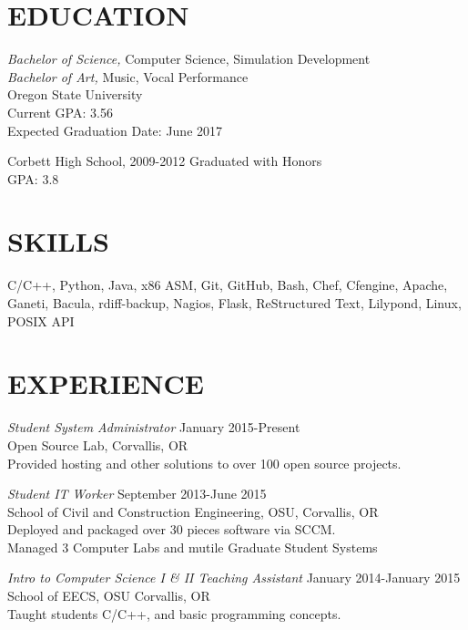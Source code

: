 \documentclass[line,margin]{res}
\begin{document}
\address{(503)-758-6952, fahlmantaylor@gmail.com, tfahl.com}
\address{github.com/fahlmant, irc: recyclops or fahlmant on freenode}
\begin{resume}
 
\section{EDUCATION}
                    {\sl Bachelor of Science,} Computer Science, Simulation Development \\
                    {\sl Bachelor of Art,} Music, Vocal Performance \\
                    Oregon State University\\
                    Current GPA: 3.56\\
                    Expected Graduation Date: June 2017 
                    
                    Corbett High School, 2009-2012
                    Graduated with Honors\\
                    GPA: 3.8
\section{SKILLS}
                    C/C++, Python, Java, x86 ASM, Git, GitHub, Bash, Chef, Cfengine, Apache, Ganeti, Bacula, rdiff-backup,
                    Nagios, Flask, ReStructured Text, Lilypond, Linux, POSIX API
\section{EXPERIENCE}
                    {\sl Student System Administrator} \hfill January 2015-Present \\
                    Open Source Lab, 
                    Corvallis, OR\\
                    Provided hosting and other solutions to over 100 open source projects.

                    {\sl Student IT Worker} \hfill September 2013-June 2015 \\
                    School of Civil and Construction Engineering, OSU, 
                    Corvallis, OR\\ 
                    Deployed and packaged over 30 pieces software via SCCM.\\
                    Managed 3 Computer Labs and mutile Graduate Student Systems

                    {\sl Intro to Computer Science I \& II Teaching Assistant} \hfill January 2014-January 2015\\
                    School of EECS, OSU
                    Corvallis, OR\\
                    Taught students C/C++, and basic programming concepts.
                    

\end{resume}
\end{document}
